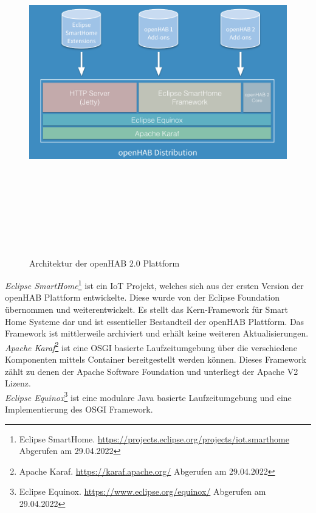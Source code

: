     \begin{figure}[hbt!]
        \centering
        \includegraphics[width=15cm,height=15cm,keepaspectratio]{images/openhab-2-architecture.png}
        \caption{Architektur der openHAB 2.0 Plattform \cite{kaikreutzer2016}}
        \label{fig:architectureopenHAB2}
    \end{figure}
    \textit{Eclipse SmartHome}\footnote{Eclipse SmartHome. \url{https://projects.eclipse.org/projects/iot.smarthome} Abgerufen am 29.04.2022} 
    ist ein \acs{IoT} Projekt, welches sich aus der ersten Version der openHAB Plattform entwickelte. 
    Diese wurde von der Eclipse Foundation übernommen und weiterentwickelt. Es stellt das Kern-Framework für Smart Home Systeme dar 
    und ist essentieller Bestandteil der openHAB Plattform. Das Framework ist mittlerweile archiviert und erhält keine weiteren 
    Aktualisierungen.
    \\
    \linebreak
    \textit{Apache Karaf}\footnote{Apache Karaf. \url{https://karaf.apache.org/} Abgerufen am 29.04.2022} 
    ist eine \acs{OSGI} basierte Laufzeitumgebung über die verschiedene Komponenten mittels Container 
    bereitgestellt werden können. Dieses Framework zählt zu denen der Apache Software Foundation und unterliegt der Apache V2 Lizenz.
    \\
    \linebreak
    \textit{Eclipse Equinox}\footnote{Eclipse Equinox. \url{https://www.eclipse.org/equinox/} Abgerufen am 29.04.2022} ist eine modulare 
    Java basierte Laufzeitumgebung und eine Implementierung des \acs{OSGI} Framework. 




